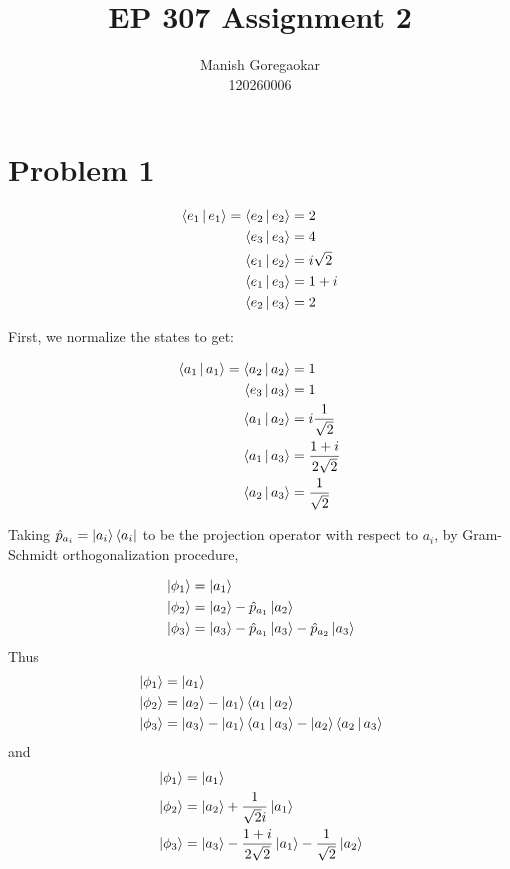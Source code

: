 \documentclass[12pt]{article}
\title{EP 307 Assignment 2}
\author{Manish Goregaokar\\120260006}
\begin{document}
\maketitle

\section*{Problem 1}

\begin{align*}
\Braket{e_1|e_1}=\Braket{e_2|e_2} &= 2\\
 \Braket{e_3|e_3} &=4\\
 \Braket{e_1|e_2} &=i\sqrt{2}\\
 \Braket{e_1|e_3} &=1+i\\
 \Braket{e_2|e_3} &=2
\end{align*}

First, we normalize the states to get:

\begin{align*}
\Braket{a_1|a_1}=\Braket{a_2|a_2} &= 1\\
 \Braket{e_3|a_3} &=1\\
 \Braket{a_1|a_2} &=i\frac1{\sqrt{2}}\\
 \Braket{a_1|a_3} &=\frac{1+i}{2\sqrt{2}}\\
 \Braket{a_2|a_3} &=\frac1{\sqrt{2}}
\end{align*}

\newcommand{\proj}[1]{\hat{p}_{a_{#1}}}
Taking $\proj i = \Ket{a_i}\Bra{a_i}$ to be the projection operator with respect to $a_i$, by Gram-Schmidt orthogonalization procedure,

\begin{align*}
&\Ket{\phi_1}=\Ket{a_1}\\
&\Ket{\phi_2}=\Ket{a_2}-\proj1\Ket{a_2}\\
&\Ket{\phi_3}=\Ket{a_3}-\proj1\Ket{a_3}-\proj2\Ket{a_3}\\
\end{align*}
\renewcommand{\proj}[2]{\Ket{a_{#1}}\Braket{a_{#1}|#2}}
Thus
\begin{align*}
&\Ket{\phi_1}=\Ket{a_1}\\
&\Ket{\phi_2}=\Ket{a_2}-\proj1{a_2}\\
&\Ket{\phi_3}=\Ket{a_3}-\proj1{a_3}-\proj2{a_3}\\
\end{align*}
and
\begin{align*}
&\Ket{\phi_1}=\Ket{a_1}\\
&\Ket{\phi_2}=\Ket{a_2}+\frac{1}{\sqrt{2}i}\Ket{a_1}\\
&\Ket{\phi_3}=\Ket{a_3}-\frac{1+i}{2\sqrt{2}}\Ket{a_1}-\frac{1}{\sqrt{2}}\Ket{a_2}\\
\end{align*}
\end{document}
